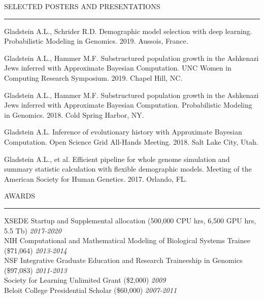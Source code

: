 \documentclass{resume} %
\renewenvironment{rSection}[1]{
\sectionskip
\textcolor{RoyalPurple}{\MakeUppercase{#1}}
\sectionlineskip
\hrule
\begin{list}{}{
\setlength{\leftmargin}{1.5em}
}
\item[]
}{
\end{list}
}
\begin{document}
\newpage


\begin{rSection}{Selected Posters and Presentations}

\item Gladstein A.L., Schrider R.D.  Demographic model selection with deep learning.  Probabilistic Modeling in Genomics. 2019. Aussois, France.

\item Gladstein A.L., Hammer M.F. Substructured population growth in the Ashkenazi Jews inferred with Approximate Bayesian Computation. UNC Women in Computing Research Symposium. 2019. Chapel Hill, NC.

\item Gladstein A.L., Hammer M.F. Substructured population growth in the Ashkenazi Jews inferred with Approximate Bayesian Computation. Probabilistic Modeling in Genomics. 2018. Cold Spring Harbor, NY.

\item Gladstein A.L. Inference of evolutionary history with Approximate Bayesian Computation. Open Science Grid All-Hands Meeting. 2018. Salt Lake City, Utah.

\item Gladstein A.L., et al. Efficient pipeline for whole genome simulation and summary statistic calculation with flexible demographic models. Meeting of the American Society for Human Genetics. 2017. Orlando, FL.

\end{rSection}


\begin{rSection}{Awards}

XSEDE Startup and Supplemental allocation (500,000 CPU hrs, 6,500 GPU hrs, 5.5 Tb) \hfill{\em 2017-2020}\\
NIH Computational and Mathematical Modeling of Biological Systems Trainee (\$71,064) \hfill {\em 2013-2014}\\
NSF Integrative Graduate Education and Research Traineeship in Genomics (\$97,083) \hfill {\em 2011-2013}\\
Society for Learning Unlimited Grant (\$2,000) \hfill {\em 2009}\\
Beloit College Presidential Scholar (\$60,000) \hfill {\em 2007-2011}

\end{rSection}
\end{document}

